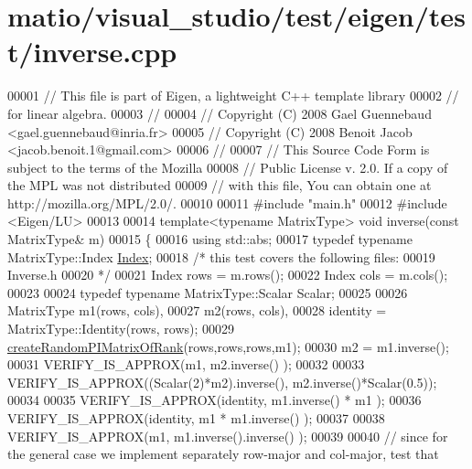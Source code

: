 \hypertarget{matio_2visual__studio_2test_2eigen_2test_2inverse_8cpp_source}{}\section{matio/visual\+\_\+studio/test/eigen/test/inverse.cpp}
\label{matio_2visual__studio_2test_2eigen_2test_2inverse_8cpp_source}

\begin{DoxyCode}
00001 \textcolor{comment}{// This file is part of Eigen, a lightweight C++ template library}
00002 \textcolor{comment}{// for linear algebra.}
00003 \textcolor{comment}{//}
00004 \textcolor{comment}{// Copyright (C) 2008 Gael Guennebaud <gael.guennebaud@inria.fr>}
00005 \textcolor{comment}{// Copyright (C) 2008 Benoit Jacob <jacob.benoit.1@gmail.com>}
00006 \textcolor{comment}{//}
00007 \textcolor{comment}{// This Source Code Form is subject to the terms of the Mozilla}
00008 \textcolor{comment}{// Public License v. 2.0. If a copy of the MPL was not distributed}
00009 \textcolor{comment}{// with this file, You can obtain one at http://mozilla.org/MPL/2.0/.}
00010 
00011 \textcolor{preprocessor}{#include "main.h"}
00012 \textcolor{preprocessor}{#include <Eigen/LU>}
00013 
00014 \textcolor{keyword}{template}<\textcolor{keyword}{typename} MatrixType> \textcolor{keywordtype}{void} inverse(\textcolor{keyword}{const} MatrixType& m)
00015 \{
00016   \textcolor{keyword}{using} std::abs;
00017   \textcolor{keyword}{typedef} \textcolor{keyword}{typename} MatrixType::Index \hyperlink{namespace_eigen_a62e77e0933482dafde8fe197d9a2cfde}{Index};
00018   \textcolor{comment}{/* this test covers the following files:}
00019 \textcolor{comment}{     Inverse.h}
00020 \textcolor{comment}{  */}
00021   Index rows = m.rows();
00022   Index cols = m.cols();
00023 
00024   \textcolor{keyword}{typedef} \textcolor{keyword}{typename} MatrixType::Scalar Scalar;
00025 
00026   MatrixType m1(rows, cols),
00027              m2(rows, cols),
00028              identity = MatrixType::Identity(rows, rows);
00029   \hyperlink{namespace_eigen_a0d9a7ddcee5c7c8defaba3628455efb2}{createRandomPIMatrixOfRank}(rows,rows,rows,m1);
00030   m2 = m1.inverse();
00031   VERIFY\_IS\_APPROX(m1, m2.inverse() );
00032 
00033   VERIFY\_IS\_APPROX((Scalar(2)*m2).inverse(), m2.inverse()*Scalar(0.5));
00034 
00035   VERIFY\_IS\_APPROX(identity, m1.inverse() * m1 );
00036   VERIFY\_IS\_APPROX(identity, m1 * m1.inverse() );
00037 
00038   VERIFY\_IS\_APPROX(m1, m1.inverse().inverse() );
00039 
00040   \textcolor{comment}{// since for the general case we implement separately row-major and col-major, test that}

\end{DoxyCode}
